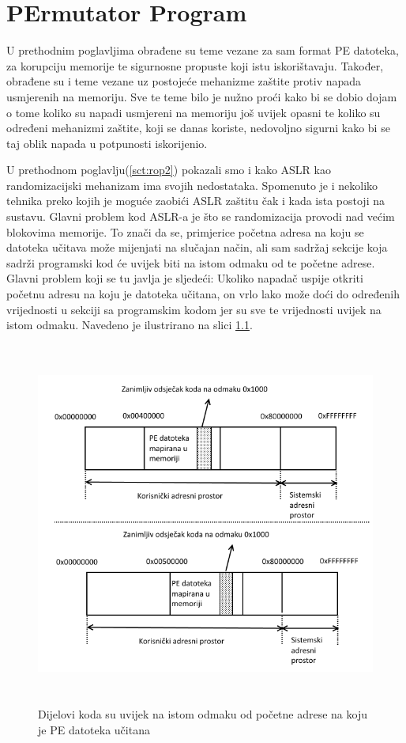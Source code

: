 \documentclass[times, utf8, diplomski, numeric]{fer}
\begin{document}
\chapter{PErmutator Program}
U prethodnim poglavljima obrađene su teme vezane za sam format PE
datoteka, za korupciju memorije te sigurnosne propuste koji istu
iskorištavaju. Također, obrađene su i teme vezane uz postojeće
mehanizme zaštite protiv napada usmjerenih na memoriju. Sve te
teme bilo je nužno proći kako bi se dobio dojam o tome koliko su
napadi usmjereni na memoriju još uvijek opasni te koliko su
određeni mehanizmi zaštite, koji se danas koriste, nedovoljno
sigurni kako bi se taj oblik napada u potpunosti iskorijenio.

U prethodnom poglavlju(\ref{sct:rop2}) pokazali smo i kako ASLR
kao randomizacijski mehanizam ima svojih nedostataka. Spomenuto
je i nekoliko tehnika preko kojih je moguće zaobići ASLR zaštitu
čak i kada ista postoji na sustavu. Glavni problem kod ASLR-a je
što se randomizacija provodi nad većim blokovima memorije. To
znači da se, primjerice početna adresa na koju se datoteka
učitava može mijenjati na slučajan način, ali sam sadržaj sekcije
koja sadrži programski kod će uvijek biti na istom odmaku od te
početne adrese. Glavni problem koji se tu javlja je sljedeći:
Ukoliko napadač uspije otkriti početnu adresu na koju je datoteka
učitana, on vrlo lako može doći do određenih vrijednosti u
sekciji sa programskim kodom jer su sve te vrijednosti uvijek na
istom odmaku. Navedeno je ilustrirano na slici
\ref{fig:aslr_permutacija}.

\begin{figure}[!htb]
\centering
\setlength\fboxsep{0pt}
\setlength\fboxrule{0.5pt}
\includegraphics[width=12cm, height=12cm]{slike/aslr_permutacija}
\caption{Dijelovi koda su uvijek na istom odmaku od početne adrese na koju je PE datoteka učitana}
\label{fig:aslr_permutacija} 
\end{figure}
\end{document}
